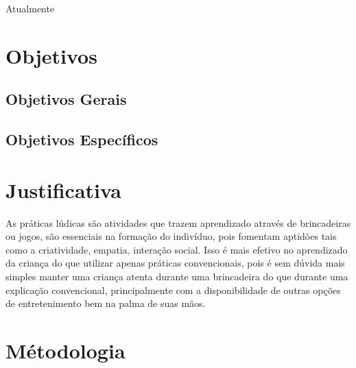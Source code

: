     Atualmente

    \section{Objetivos}

        \subsection{Objetivos Gerais}

        \subsection{Objetivos Específicos}

    \section{Justificativa}

        As práticas lúdicas são atividades que trazem aprendizado através de brincadeiras ou jogos, são essenciais na
        formação do indivíduo, pois fomentam aptidões tais como a criatividade, empatia, interação social. Isso é mais
        efetivo no aprendizado da criança do que utilizar apenas práticas convencionais, pois é sem dúvida mais simples
        manter uma criança atenta durante uma brincadeira do que durante uma explicação convencional, principalmente com
        a disponibilidade de outras opções de entretenimento bem na palma de suas mãos. \cite{Santos_Thayna_da_silva_2021}

    \section{Métodologia}